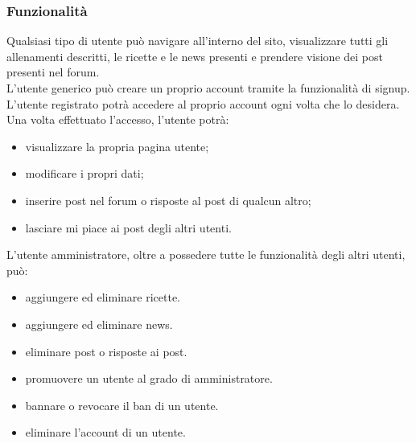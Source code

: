 \subsubsection{Funzionalità}
\label{subs:funzionalità}
Qualsiasi tipo di utente può navigare all'interno del sito, visualizzare tutti gli allenamenti descritti, le ricette e le news presenti e prendere visione dei post presenti nel forum.\\
L'utente generico può creare un proprio account tramite la funzionalità di signup. L'utente registrato potrà accedere al proprio account ogni volta che lo desidera. Una volta effettuato l'accesso, l'utente potrà:
\begin{itemize}
    \item visualizzare la propria pagina utente;
    \item modificare i propri dati;
    \item inserire post nel forum o risposte al post di qualcun altro;
    \item lasciare mi piace ai post degli altri utenti.
\end{itemize}
L'utente amministratore, oltre a possedere tutte le funzionalità degli altri utenti, può:
\begin{itemize}
	\item aggiungere ed eliminare ricette.
	\item aggiungere ed eliminare news.
	\item eliminare post o risposte ai post.
	\item promuovere un utente al grado di amministratore.
	\item bannare o revocare il ban di un utente.
	\item eliminare l'account di un utente.
\end{itemize}

